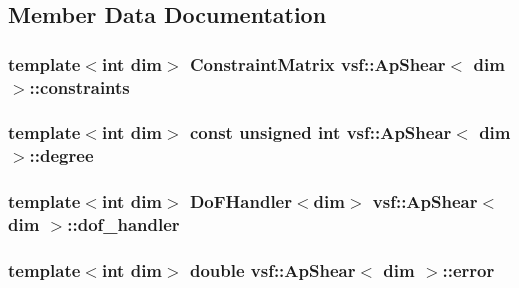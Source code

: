 \subsection{Member Data Documentation}
\hypertarget{classvsf_1_1ApShear_afcd25b4c0be9a4c7e69165e6eb151240}{
\subsubsection[{constraints}]{\setlength{\rightskip}{0pt plus 5cm}template$<$int dim$>$ Constraint\-Matrix {\bf vsf\-::\-Ap\-Shear}$<$ dim $>$\-::constraints\hspace{0.3cm}{\ttfamily [private]}}}\label{classvsf_1_1ApShear_afcd25b4c0be9a4c7e69165e6eb151240}
\hypertarget{classvsf_1_1ApShear_ae4927f95e4a98c107d743a078a9b1bc8}{
\subsubsection[{degree}]{\setlength{\rightskip}{0pt plus 5cm}template$<$int dim$>$ const unsigned int {\bf vsf\-::\-Ap\-Shear}$<$ dim $>$\-::degree\hspace{0.3cm}{\ttfamily [private]}}}\label{classvsf_1_1ApShear_ae4927f95e4a98c107d743a078a9b1bc8}
\hypertarget{classvsf_1_1ApShear_a55da0ced5f7ee7c16a518073f4524ffb}{
\subsubsection[{dof\-\_\-handler}]{\setlength{\rightskip}{0pt plus 5cm}template$<$int dim$>$ Do\-F\-Handler$<$dim$>$ {\bf vsf\-::\-Ap\-Shear}$<$ dim $>$\-::dof\-\_\-handler\hspace{0.3cm}{\ttfamily [private]}}}\label{classvsf_1_1ApShear_a55da0ced5f7ee7c16a518073f4524ffb}
\hypertarget{classvsf_1_1ApShear_a980e61d73be5cae2b8e8498b9ffc087a}{
\subsubsection[{error}]{\setlength{\rightskip}{0pt plus 5cm}template$<$int dim$>$ double {\bf vsf\-::\-Ap\-Shear}$<$ dim $>$\-::error\hspace{0.3cm}{\ttfamily [private]}}}\label{classvsf_1_1ApShear_a980e61d73be5cae2b8e8498b9ffc087a}
